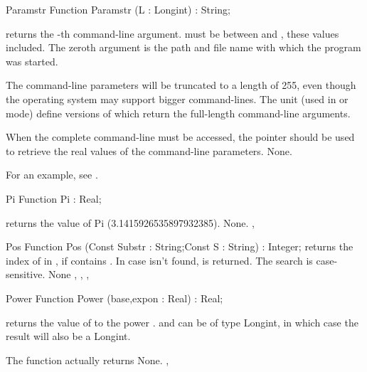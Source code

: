 \begin{function}{Paramstr}
\Declaration
Function Paramstr (L : Longint) : String;

\Description
{} returns the -th command-line argument.  must
be between  and , these values included.
The zeroth argument is the path and file name with which the program was
started.

The command-line parameters will be truncated to a length of 255,
even though the operating system may support bigger command-lines.
The  unit (used in  or  mode) define versions
of  which return the full-length command-line arguments.

When the complete command-line must be accessed, the  pointer
should be used to retrieve the real values of the command-line parameters.
\Errors
None.
\SeeAlso
{}
\end{function}
For an example, see .
\begin{function}{Pi}
\Declaration
Function Pi  : Real;

\Description
{} returns the value of Pi (3.1415926535897932385).
\Errors
None.
\SeeAlso
{}, 
\end{function}


\begin{function}{Pos}
\Declaration
Function Pos (Const Substr : String;Const S : String) : Integer;
\Description
{} returns the index of  in , if  contains
. In case  isn't found,  is returned.
The search is case-sensitive.
\Errors
None
\SeeAlso
{}, , , 
\end{function}


\begin{function}{Power}
\Declaration
Function Power (base,expon : Real) : Real;
\Description

 returns the value of  to the power .
 and  can be of type Longint, in which case the
result will also be a Longint.

The function actually returns 
\Errors
None.
\SeeAlso
{}, 
\end{function}


